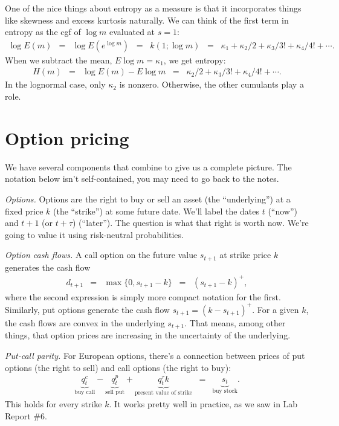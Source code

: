 \documentclass[11pt]{article}
\begin{document}
One of the nice things about entropy as a measure is that it incorporates
things like skewness and excess kurtosis naturally.
We can think of the first term in entropy as the cgf of $\log m$
evaluated at $s=1$:
\begin{eqnarray*}
   \log E(m) &=& \log E \left( e^{\log m}\right)
        \;\;=\;\; k(1; \log m)
        \;\;=\;\; \kappa_1 + \kappa_2/ 2 + \kappa_3/3! + \kappa_4/4! + \cdots .
\end{eqnarray*}
When we subtract the mean, $E \log m = \kappa_1$, we get entropy:
\begin{eqnarray*}
   H(m)  &=& \log E(m) - E \log m
        \;\;=\;\; \kappa_2/ 2 + \kappa_3/3! + \kappa_4/4! + \cdots .
\end{eqnarray*}
In the lognormal case, only $\kappa_2$ is nonzero.
Otherwise, the other cumulants play a role.


\section{Option pricing}

We have several components that combine to give us a complete picture.
The notation below isn't self-contained, you may need to go back to the notes.


{\it Options.\/}
Options are the right to buy or sell an asset
(the ``underlying'')
at a fixed price $k$ (the ``strike'')
at some future date.
We'll label the dates $t$ (``now'') and $t+1$ (or $t+\tau$) (``later'').
The question is what that right is worth now.
We're going to value it using risk-neutral probabilities.

{\it Option cash flows.\/} 
A call option on the future value $ s_{t+1} $ at strike price $k$
generates the cash flow 
\begin{eqnarray*}
        d_{t+1} &=& \max \{ 0, s_{t+1} - k \} 
                \;\;=\;\;  (s_{t+1} - k)^+ ,
\end{eqnarray*} 
where the second expression is simply more compact notation for the first.  
Similarly, put options generate the cash flow $ s_{t+1} = (k - s_{t+1})^+ $. 
For a given $k$, the cash flows are convex in the underlying $ s_{t+1}$.  
That means, among other things, that option prices are increasing 
in the uncertainty of the underlying.  

{\it Put-call parity.\/}
For European options, there's a connection between prices of put options
(the right to sell) and call options (the right to buy):
\begin{eqnarray*}
    \underbrace{q^c_t}_{\mbox{buy call}} -
    \underbrace{q^p_t}_{\mbox{sell put}} +
    \underbrace{q^\tau_t k}_{\mbox{present value of strike}}
    &=&
    \underbrace{s_t}_{\mbox{buy stock}} .
    \label{eq:put-call-parity}
\end{eqnarray*}
This holds for every strike $k$.
It works pretty well in practice, as we saw in Lab Report \#6.
\end{document}
